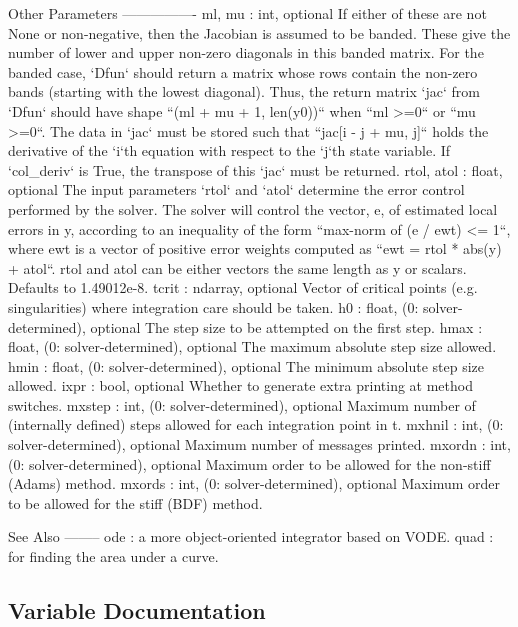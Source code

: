 \begin{DoxyVerb}
Other Parameters
----------------
ml, mu : int, optional
    If either of these are not None or non-negative, then the
    Jacobian is assumed to be banded.  These give the number of
    lower and upper non-zero diagonals in this banded matrix.
    For the banded case, `Dfun` should return a matrix whose
    rows contain the non-zero bands (starting with the lowest diagonal).
    Thus, the return matrix `jac` from `Dfun` should have shape
    ``(ml + mu + 1, len(y0))`` when ``ml >=0`` or ``mu >=0``.
    The data in `jac` must be stored such that ``jac[i - j + mu, j]``
    holds the derivative of the `i`th equation with respect to the `j`th
    state variable.  If `col_deriv` is True, the transpose of this
    `jac` must be returned.
rtol, atol : float, optional
    The input parameters `rtol` and `atol` determine the error
    control performed by the solver.  The solver will control the
    vector, e, of estimated local errors in y, according to an
    inequality of the form ``max-norm of (e / ewt) <= 1``,
    where ewt is a vector of positive error weights computed as
    ``ewt = rtol * abs(y) + atol``.
    rtol and atol can be either vectors the same length as y or scalars.
    Defaults to 1.49012e-8.
tcrit : ndarray, optional
    Vector of critical points (e.g. singularities) where integration
    care should be taken.
h0 : float, (0: solver-determined), optional
    The step size to be attempted on the first step.
hmax : float, (0: solver-determined), optional
    The maximum absolute step size allowed.
hmin : float, (0: solver-determined), optional
    The minimum absolute step size allowed.
ixpr : bool, optional
    Whether to generate extra printing at method switches.
mxstep : int, (0: solver-determined), optional
    Maximum number of (internally defined) steps allowed for each
    integration point in t.
mxhnil : int, (0: solver-determined), optional
    Maximum number of messages printed.
mxordn : int, (0: solver-determined), optional
    Maximum order to be allowed for the non-stiff (Adams) method.
mxords : int, (0: solver-determined), optional
    Maximum order to be allowed for the stiff (BDF) method.

See Also
--------
ode : a more object-oriented integrator based on VODE.
quad : for finding the area under a curve.\end{DoxyVerb}
 

\subsection{Variable Documentation}
\hypertarget{namespacescipy_1_1integrate_1_1odepack_afb01c38a5ee4953c8478391c54928657}{}

